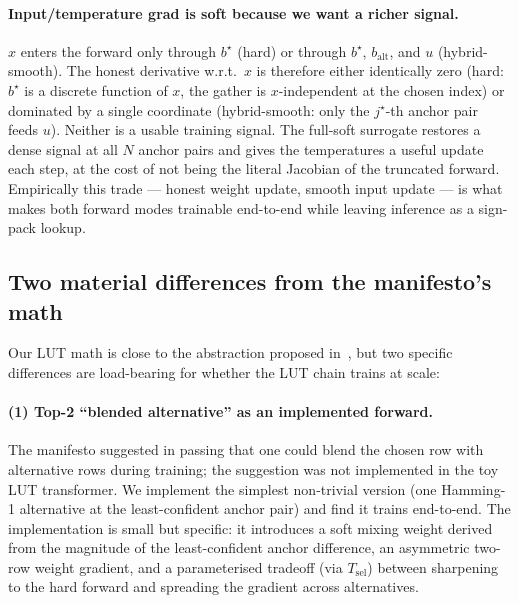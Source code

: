 \documentclass[11pt]{article}
\newcommand{\Tsel}{T_{\mathrm{sel}}}
\newcommand{\bstar}{b^{\star}}
\newcommand{\jstar}{j^{\star}}
\begin{document}
\paragraph{Input/temperature grad is soft because we want a richer signal.} $x$ enters the forward only through $\bstar$ (hard) or through $\bstar$, $b_{\text{alt}}$, and $u$ (hybrid-smooth). The honest derivative w.r.t.\ $x$ is therefore either identically zero (hard: $\bstar$ is a discrete function of $x$, the gather is $x$-independent at the chosen index) or dominated by a single coordinate (hybrid-smooth: only the $\jstar$-th anchor pair feeds $u$). Neither is a usable training signal. The full-soft surrogate restores a dense signal at all $N$ anchor pairs and gives the temperatures a useful update each step, at the cost of not being the literal Jacobian of the truncated forward. Empirically this trade --- honest weight update, smooth input update --- is what makes both forward modes trainable end-to-end while leaving inference as a sign-pack lookup.

\subsection{Two material differences from the manifesto's math}

Our LUT math is close to the abstraction proposed in~\citep{manifesto}, but two specific differences are load-bearing for whether the LUT chain trains at scale:

\paragraph{(1) Top-2 ``blended alternative'' as an implemented forward.} The manifesto suggested in passing that one could blend the chosen row with alternative rows during training; the suggestion was not implemented in the toy LUT transformer. We implement the simplest non-trivial version (one Hamming-1 alternative at the least-confident anchor pair) and find it trains end-to-end. The implementation is small but specific: it introduces a soft mixing weight derived from the magnitude of the least-confident anchor difference, an asymmetric two-row weight gradient, and a parameterised tradeoff (via $\Tsel$) between sharpening to the hard forward and spreading the gradient across alternatives.
\end{document}
